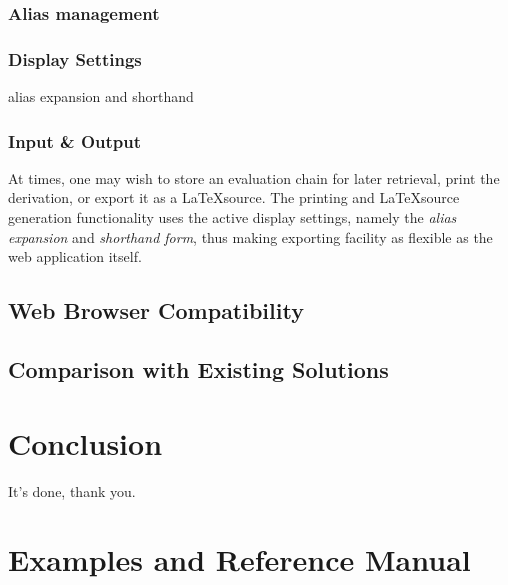 \documentclass[a4paper,10pt]{article}
\begin{document}
\subsubsection{Alias management}

\subsubsection{Display Settings}
alias expansion and shorthand

\subsubsection{Input \& Output}
At times, one may wish to store an evaluation chain for later retrieval, print the derivation,
or export it as a \LaTeX\;source.
The printing and \LaTeX\;source generation functionality uses the active display settings,
namely the \textit{alias expansion} and \textit{shorthand form}, thus making exporting
facility as flexible as the web application itself.

\subsection{Web Browser Compatibility}
\subsection{Comparison with Existing Solutions}

\section{Conclusion}
It's done, thank you.

\appendix
\section{Examples and Reference Manual}
\end{document}
